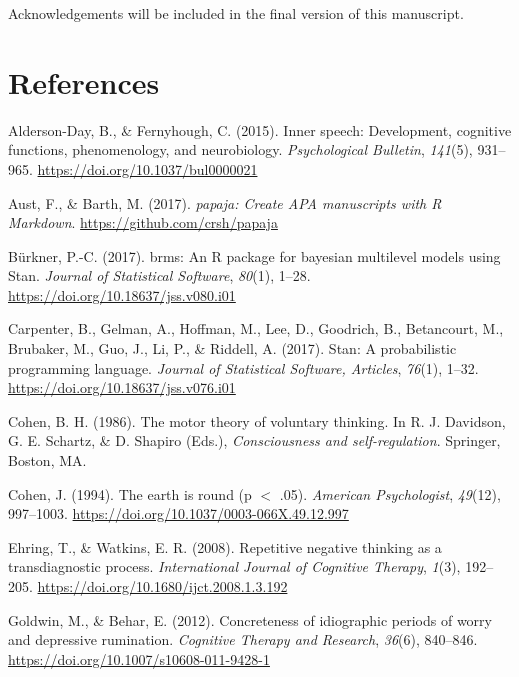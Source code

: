 \documentclass[
  english,
  man, donotrepeattitle,floatsintext]{apa6}
\newlength{\cslhangindent}
\newenvironment{cslreferences}%
  {\setlength{\parindent}{0pt}%
  \everypar{\setlength{\hangindent}{\cslhangindent}}\ignorespaces}%
  {\par}
\begin{document}
Acknowledgements will be included in the final version of this manuscript.

\hypertarget{references}{%
\section*{References}\label{references}}

\hypertarget{refs}{}
\begin{cslreferences}
\leavevmode\hypertarget{ref-alderson-day_inner_2015}{}%
Alderson-Day, B., \& Fernyhough, C. (2015). Inner speech: Development, cognitive functions, phenomenology, and neurobiology. \emph{Psychological Bulletin}, \emph{141}(5), 931--965. \url{https://doi.org/10.1037/bul0000021}

\leavevmode\hypertarget{ref-R-papaja}{}%
Aust, F., \& Barth, M. (2017). \emph{papaja: Create APA manuscripts with R Markdown}. \url{https://github.com/crsh/papaja}

\leavevmode\hypertarget{ref-R-brms}{}%
Bürkner, P.-C. (2017). brms: An R package for bayesian multilevel models using Stan. \emph{Journal of Statistical Software}, \emph{80}(1), 1--28. \url{https://doi.org/10.18637/jss.v080.i01}

\leavevmode\hypertarget{ref-carpenter_stan_2017}{}%
Carpenter, B., Gelman, A., Hoffman, M., Lee, D., Goodrich, B., Betancourt, M., Brubaker, M., Guo, J., Li, P., \& Riddell, A. (2017). Stan: A probabilistic programming language. \emph{Journal of Statistical Software, Articles}, \emph{76}(1), 1--32. \url{https://doi.org/10.18637/jss.v076.i01}

\leavevmode\hypertarget{ref-cohen_motor_1986}{}%
Cohen, B. H. (1986). The motor theory of voluntary thinking. In R. J. Davidson, G. E. Schartz, \& D. Shapiro (Eds.), \emph{Consciousness and self-regulation}. Springer, Boston, MA.

\leavevmode\hypertarget{ref-cohen_earth_1994}{}%
Cohen, J. (1994). The earth is round (p \(<\) .05). \emph{American Psychologist}, \emph{49}(12), 997--1003. \url{https://doi.org/10.1037/0003-066X.49.12.997}

\leavevmode\hypertarget{ref-ehring_repetitive_2008}{}%
Ehring, T., \& Watkins, E. R. (2008). Repetitive negative thinking as a transdiagnostic process. \emph{International Journal of Cognitive Therapy}, \emph{1}(3), 192--205. \url{https://doi.org/10.1680/ijct.2008.1.3.192}

\leavevmode\hypertarget{ref-goldwin_concreteness_2012}{}%
Goldwin, M., \& Behar, E. (2012). Concreteness of idiographic periods of worry and depressive rumination. \emph{Cognitive Therapy and Research}, \emph{36}(6), 840--846. \url{https://doi.org/10.1007/s10608-011-9428-1}


\end{cslreferences}
\end{document}
